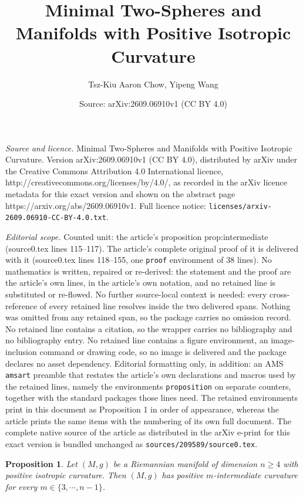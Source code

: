 \documentclass[10pt,a4paper]{amsart}
\title{Minimal Two-Spheres and Manifolds with Positive Isotropic Curvature}
\author{Tsz-Kiu Aaron Chow, Yipeng Wang}
\date{Source: arXiv:2609.06910v1 (CC BY 4.0)}
\newtheorem{proposition}{Proposition}
\begin{document}
\maketitle

\noindent\emph{Source and licence.} Minimal Two-Spheres and Manifolds with Positive Isotropic Curvature. Version arXiv:2609.06910v1 (CC BY 4.0), distributed by arXiv under the Creative Commons Attribution 4.0 International licence, http://creativecommons.org/licenses/by/4.0/, as recorded in the arXiv licence metadata for this exact version and shown on the abstract page https://arxiv.org/abs/2609.06910v1. Full licence notice: \texttt{licenses/arxiv-2609.06910-CC-BY-4.0.txt}.\par\smallskip

\noindent\textit{Editorial scope.} Counted unit: the article's proposition prop:intermediate (source0.tex lines 115--117). The article's complete original proof of it is delivered with it (source0.tex lines 118--155, one \texttt{proof} environment of 38 lines). No mathematics is written, repaired or re-derived: the statement and the proof are the article's own lines, in the article's own notation, and no retained line is substituted or re-flowed.  No further source-local context is needed: every cross-reference of every retained line resolves inside the two delivered spans.  Nothing was omitted from any retained span, so the package carries no omission record.  No retained line contains a citation, so the wrapper carries no bibliography and no bibliography entry.  No retained line contains a figure environment, an image-inclusion command or drawing code, so no image is delivered and the package declares no asset dependency.  Editorial formatting only, in addition: an AMS \texttt{amsart} preamble that restates the article's own declarations and macros used by the retained lines, namely the environments \texttt{proposition} on separate counters, together with the standard packages those lines need.  The retained environments print in this document as Proposition 1 in order of appearance, whereas the article prints the same items with the numbering of its own full document.  The complete native source of the article as distributed in the arXiv e-print for this exact version is bundled unchanged as \texttt{sources/209589/source0.tex}.
\begin{proposition}\label{prop:intermediate}
Let $(M,g)$ be a Riemannian manifold of dimension $n\geq 4$ with positive isotropic curvature. Then $(M,g)$ has positive $m$-intermediate curvature for every $m\in \{3,\cdots, n-1\}$.     
\end{proposition}
\end{document}
